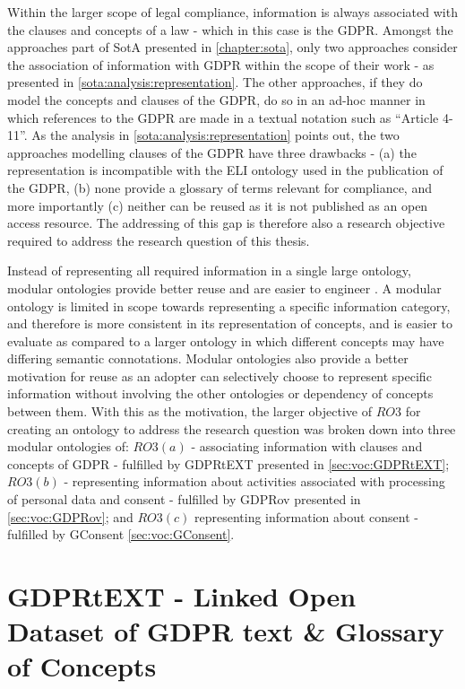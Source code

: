 Within the larger scope of legal compliance, information is always associated with the clauses and concepts of a law - which in this case is the GDPR.
Amongst the approaches part of SotA presented in \autoref{chapter:sota}, only two approaches consider the association of information with GDPR within the scope of their work - as presented in \autoref{sota:analysis:representation}.
The other approaches, if they do model the concepts and clauses of the GDPR, do so in an ad-hoc manner in which references to the GDPR are made in a textual notation such as ``Article 4-11''.
As the analysis in \autoref{sota:analysis:representation} points out, the two approaches modelling clauses of the GDPR have three drawbacks - (a) the representation is incompatible with the ELI ontology used in the publication of the GDPR, (b) none provide a glossary of terms relevant for compliance, and more importantly (c) neither can be reused as it is not published as an open access resource.
The addressing of this gap is therefore also a research objective required to address the research question of this thesis.

Instead of representing all required information in a single large ontology, modular ontologies provide better reuse and are easier to engineer \cite{suarez-figueroa_neon_2012}.
A modular ontology is limited in scope towards representing a specific information category, and therefore is more consistent in its representation of concepts, and is easier to evaluate as compared to a larger ontology in which different concepts may have differing semantic connotations.
Modular ontologies also provide a better motivation for reuse as an adopter can selectively choose to represent specific information without involving the other ontologies or dependency of concepts between them.
With this as the motivation, the larger objective of $RO3$ for creating an ontology to address the research question was broken down into three modular ontologies of: $RO3(a)$ - associating information with clauses and concepts of GDPR - fulfilled by GDPRtEXT presented in \autoref{sec:voc:GDPRtEXT}; $RO3(b)$ - representing information about activities associated with processing of personal data and consent - fulfilled by GDPRov presented in \autoref{sec:voc:GDPRov}; and $RO3(c)$ representing information about consent - fulfilled by GConsent \autoref{sec:voc:GConsent}.


\section{GDPRtEXT - Linked Open Dataset of GDPR text \& Glossary of Concepts}\label{sec:voc:GDPRtEXT}

